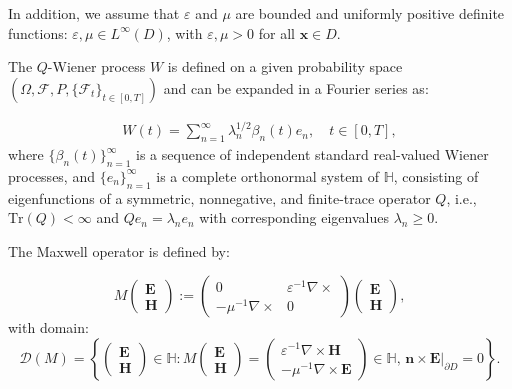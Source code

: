 \documentclass[preprint,12pt]{elsarticle}
\begin{document}
	In addition, we assume that \( \varepsilon \) and \( \mu \) are bounded and uniformly positive definite functions: \( \varepsilon, \mu \in L^{\infty}(D) \), with \( \varepsilon, \mu > 0 \) for all \( \bm{x} \in D \).
	
	The \( Q \)-Wiener process \( W \) is defined on a given probability space \( (\Omega, \mathscr{F}, P, \{\mathscr{F}_t\}_{t \in [0,T]}) \) and can be expanded in a Fourier series as:
	
	\begin{align*}
		W(t) = \sum_{n=1}^{\infty} \lambda_n^{1/2} \beta_n(t) e_n, \quad t \in [0,T],
	\end{align*}
	where \( \{\beta_n(t)\}_{n=1}^{\infty} \) is a sequence of independent standard real-valued Wiener processes, and \( \{e_n\}_{n=1}^{\infty} \) is a complete orthonormal system of \( \mathbb{H} \), consisting of eigenfunctions of a symmetric, nonnegative, and finite-trace operator \( Q \), i.e., \( \text{Tr}(Q) < \infty \) and \( Q e_n = \lambda_n e_n \) with corresponding eigenvalues \( \lambda_n \geq 0 \).
	
	The Maxwell operator is defined by:
	
	\begin{equation}\label{eq1}
		M \begin{pmatrix}
			\bm{E} \\
			\bm{H}
		\end{pmatrix}
		:= \begin{pmatrix}
			0 & \varepsilon^{-1} \nabla \times \\
			-\mu^{-1} \nabla \times & 0
		\end{pmatrix}
		\begin{pmatrix}
			\bm{E} \\
			\bm{H}
		\end{pmatrix},
	\end{equation}
	with domain:
	\begin{equation*}
		\mathcal{D}(M) = \left\{
		\begin{pmatrix}
			\bm{E} \\
			\bm{H}
		\end{pmatrix}
		\in \mathbb{H} : M \begin{pmatrix}
			\bm{E} \\
			\bm{H}
		\end{pmatrix}
		= \begin{pmatrix}
			\varepsilon^{-1} \nabla \times \bm{H} \\
			-\mu^{-1} \nabla \times \bm{E}
		\end{pmatrix}
		\in \mathbb{H}, \, \bm{n} \times \bm{E} \bigg|_{\partial D} = 0 \right\}.
	\end{equation*}
	
\end{document}
